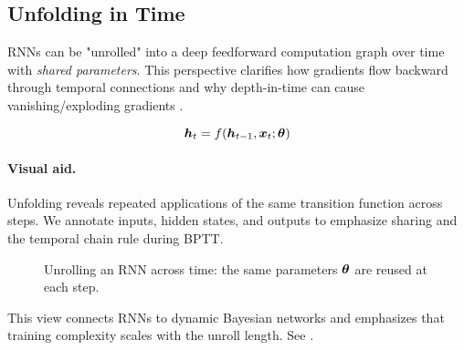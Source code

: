 \subsection{Unfolding in Time}

RNNs can be "unrolled" into a deep feedforward computation graph over time with \emph{shared parameters}. This perspective clarifies how gradients flow backward through temporal connections and why depth-in-time can cause vanishing/exploding gradients \cite{GoodfellowEtAl2016}.

\begin{equation}
\boldsymbol{h}_t = f(\boldsymbol{h}_{t-1}, \boldsymbol{x}_t; \boldsymbol{\theta})
\end{equation}

\paragraph{Visual aid.} Unfolding reveals repeated applications of the same transition function across steps. We annotate inputs, hidden states, and outputs to emphasize sharing and the temporal chain rule during BPTT.
\begin{figure}[h]
    \centering
    \caption{Unrolling an RNN across time: the same parameters $\boldsymbol{\theta}$ are reused at each step.}
\end{figure}

This view connects RNNs to dynamic Bayesian networks and emphasizes that training complexity scales with the unroll length. See \cite{WebRNNWikipedia,GoodfellowEtAl2016,D2LChapterRNN}.

